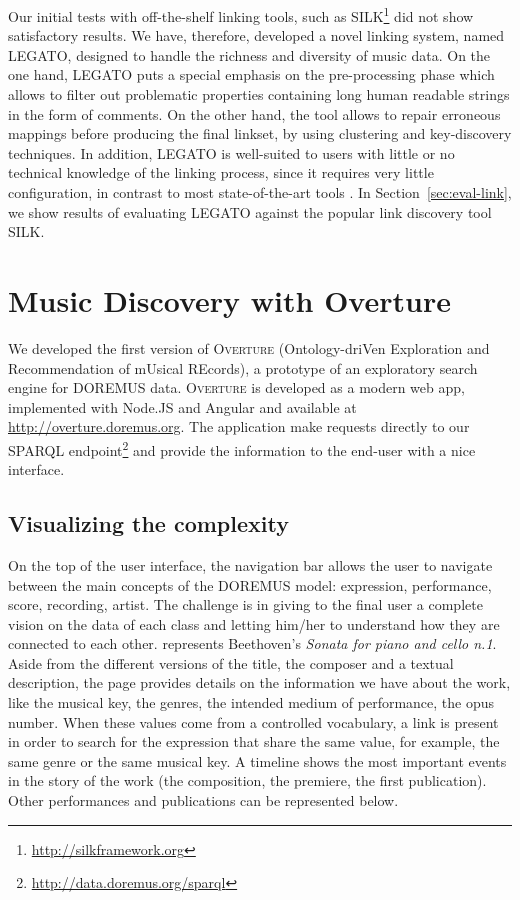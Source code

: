 \documentclass{article}
\begin{document}
Our initial tests with off-the-shelf linking tools, such as SILK\footnote{\url{http://silkframework.org}} did not show satisfactory results. We have, therefore, developed a novel linking system, named LEGATO, designed to handle the richness and diversity of music data. On the one hand, LEGATO puts a special emphasis on the pre-processing phase which allows to filter out problematic properties containing long human readable strings in the form of comments. On the other hand, the tool allows to repair erroneous mappings before producing the final linkset, by using clustering and key-discovery techniques. In addition, LEGATO is well-suited to users with little or no technical knowledge of the linking process, since it requires very little configuration, in contrast to most state-of-the-art tools \cite{nentwig2015survey}. In Section~\ref{sec:eval-link}, we show results of evaluating LEGATO against the popular link discovery tool SILK.


\section{Music Discovery with Overture}
\label{sec:exploration}
We developed the first version of \textsc{Overture} (Ontology-driVen Exploration and Recommendation of mUsical REcords), a prototype of an exploratory search engine for DOREMUS data. \textsc{Overture} is developed as a modern web app, implemented with Node.JS and Angular and available at \url{http://overture.doremus.org}. The application make requests directly to our SPARQL endpoint\footnote{\url{http://data.doremus.org/sparql}} and provide the information to the end-user with a nice interface. %

\subsection{Visualizing the complexity}
On the top of the user interface, the navigation bar allows the user to navigate between the main concepts of the DOREMUS model: expression, performance, score, recording, artist. The challenge is in giving to the final user a complete vision on the data of each class and letting him/her to understand how they are connected to each other.  represents Beethoven's \textit{Sonata for piano and cello n.1}. Aside from the different versions of the title, the composer and a textual description, the page provides details on the information we have about the work, like the musical key, the genres, the intended medium of performance, the opus number. When these values come from a controlled vocabulary, a link is present in order to search for the expression that share the same value, for example, the same genre or the same musical key. A timeline shows the most important events in the story of the work (the composition, the premiere, the first publication). Other performances and publications can be represented below.
\end{document}
